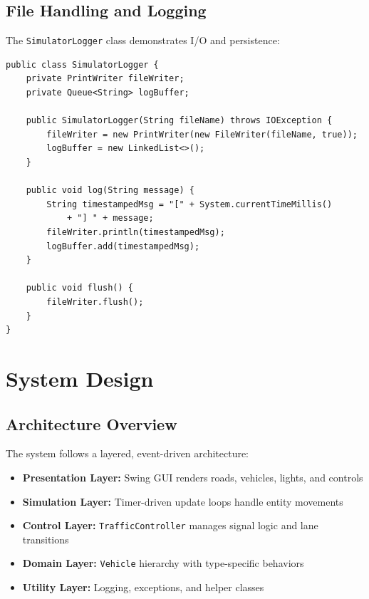 \documentclass[12pt,a4paper]{article}
\begin{document}
\subsection{File Handling and Logging}
The \texttt{SimulatorLogger} class demonstrates I/O and persistence:

\begin{lstlisting}
public class SimulatorLogger {
    private PrintWriter fileWriter;
    private Queue<String> logBuffer;
    
    public SimulatorLogger(String fileName) throws IOException {
        fileWriter = new PrintWriter(new FileWriter(fileName, true));
        logBuffer = new LinkedList<>();
    }
    
    public void log(String message) {
        String timestampedMsg = "[" + System.currentTimeMillis() 
            + "] " + message;
        fileWriter.println(timestampedMsg);
        logBuffer.add(timestampedMsg);
    }
    
    public void flush() {
        fileWriter.flush();
    }
}
\end{lstlisting}

\section{System Design}
\subsection{Architecture Overview}
The system follows a layered, event-driven architecture:
\begin{itemize}
    \item \textbf{Presentation Layer:} Swing GUI renders roads, vehicles, lights, and controls
    \item \textbf{Simulation Layer:} Timer-driven update loops handle entity movements
    \item \textbf{Control Layer:} \texttt{TrafficController} manages signal logic and lane transitions
    \item \textbf{Domain Layer:} \texttt{Vehicle} hierarchy with type-specific behaviors
    \item \textbf{Utility Layer:} Logging, exceptions, and helper classes
\end{itemize}
\end{document}
